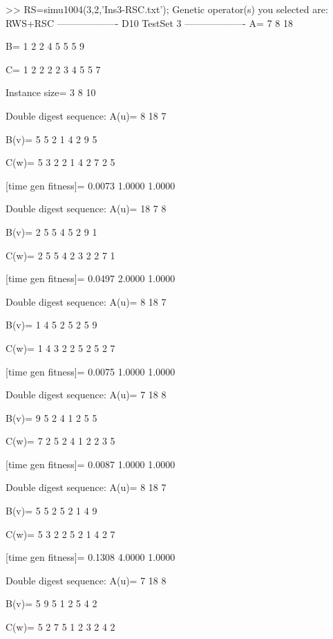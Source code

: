 >> RS=simu1004(3,2,'Ins3-RSC.txt');
Genetic operator(s) you selected are:
RWS+RSC
------------------- D10 TestSet 3 -------------------
A=
     7     8    18

B=
     1     2     2     4     5     5     5     9

C=
     1     2     2     2     2     3     4     5     5     7

Instance size=
     3     8    10

Double digest sequence:
A(u)=
     8    18     7

B(v)=
     5     5     2     1     4     2     9     5

C(w)=
     5     3     2     2     1     4     2     7     2     5

[time gen fitness]=
    0.0073    1.0000    1.0000

Double digest sequence:
A(u)=
    18     7     8

B(v)=
     2     5     5     4     5     2     9     1

C(w)=
     2     5     5     4     2     3     2     2     7     1

[time gen fitness]=
    0.0497    2.0000    1.0000

Double digest sequence:
A(u)=
     8    18     7

B(v)=
     1     4     5     2     5     2     5     9

C(w)=
     1     4     3     2     2     5     2     5     2     7

[time gen fitness]=
    0.0075    1.0000    1.0000

Double digest sequence:
A(u)=
     7    18     8

B(v)=
     9     5     2     4     1     2     5     5

C(w)=
     7     2     5     2     4     1     2     2     3     5

[time gen fitness]=
    0.0087    1.0000    1.0000

Double digest sequence:
A(u)=
     8    18     7

B(v)=
     5     5     2     5     2     1     4     9

C(w)=
     5     3     2     2     5     2     1     4     2     7

[time gen fitness]=
    0.1308    4.0000    1.0000

Double digest sequence:
A(u)=
     7    18     8

B(v)=
     5     9     5     1     2     5     4     2

C(w)=
     5     2     7     5     1     2     3     2     4     2

